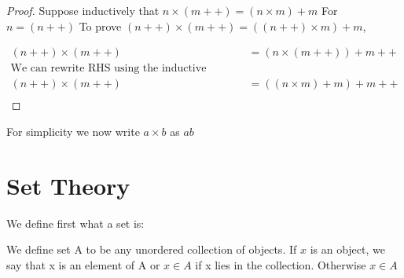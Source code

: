 \documentclass[11pt]{report}
\begin{document}
\begin{proof}
	Suppose inductively that $n \times (m++) = (n \times m) + m$
	For $n = (n++)$
	To prove $(n++) \times (m++) = ((n++) \times m) + m$,

	\begin{align*}
		(n++) \times (m++) & = (n \times (m++)) + m++            \\
		\text{We can rewrite RHS using the inductive hypothesis} \\
		(n++) \times (m++) & = ((n \times m) + m) + m++          \\
	\end{align*}
\end{proof}

For simplicity we now write \(a \times b\) as \(ab\)
\chapter{Set Theory}
\label{sec:org7b352c4}
We define first what a set is:

\begin{definition}[Sets]
	We define set A to be any unordered collection of objects. If $x$ is an object, we say that x is an element of A or $x \in A$ if x lies in the collection. Otherwise $x \in A$
\end{definition}
\end{document}
